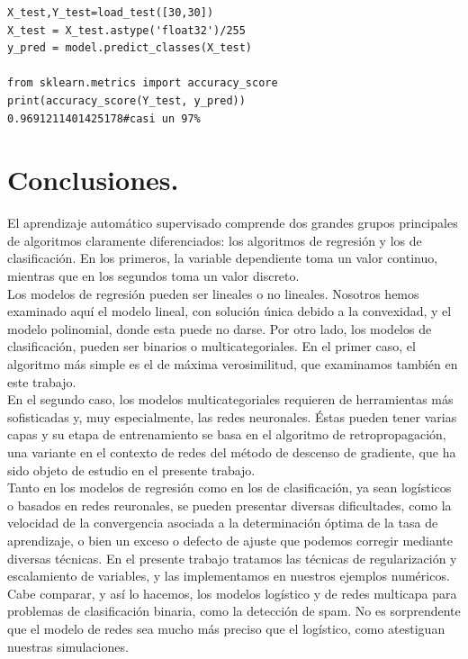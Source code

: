 \documentclass[a4paper,11pt]{article}
\begin{document}
\begin{lstlisting}
X_test,Y_test=load_test([30,30])
X_test = X_test.astype('float32')/255 
y_pred = model.predict_classes(X_test)

from sklearn.metrics import accuracy_score
print(accuracy_score(Y_test, y_pred))
0.9691211401425178#casi un 97%
\end{lstlisting}
\newpage

\section{Conclusiones.}

El aprendizaje automático supervisado comprende dos grandes grupos principales de algoritmos claramente diferenciados: los algoritmos de regresión y los de clasificación. En los primeros, la variable dependiente toma un valor continuo, mientras que en los segundos toma un valor discreto. \\

\noindent
Los modelos de regresión pueden ser lineales o no lineales. Nosotros hemos examinado aquí el modelo lineal, con solución única debido a la convexidad, y el modelo polinomial, donde esta puede no darse. Por otro lado, los modelos de clasificación, pueden ser binarios o multicategoriales. En el primer caso, el algoritmo más simple es el de máxima verosimilitud, que examinamos también en este trabajo.\\

\noindent
En el segundo caso, los modelos multicategoriales requieren de herramientas más sofisticadas y, muy especialmente, las redes neuronales. Éstas pueden tener varias capas y su etapa de entrenamiento se basa en el algoritmo de retropropagación, una variante en el contexto de redes del método de descenso de gradiente, que ha sido objeto de estudio en el presente trabajo. \\

\noindent
Tanto en los modelos de regresión como en los de clasificación, ya sean logísticos o basados en redes reuronales, se pueden presentar diversas dificultades, como la velocidad de la convergencia asociada a la determinación óptima de la tasa de aprendizaje, o bien un exceso o defecto de ajuste que podemos corregir mediante diversas técnicas. En el presente trabajo tratamos las técnicas de regularización y escalamiento de variables, y las implementamos en nuestros ejemplos numéricos.\\

\noindent
Cabe comparar, y así lo hacemos, los modelos logístico y de redes multicapa para problemas de clasificación binaria, como la detección de spam. No es sorprendente que el modelo de redes sea mucho más preciso que el logístico, como atestiguan nuestras simulaciones.\\
\end{document}
